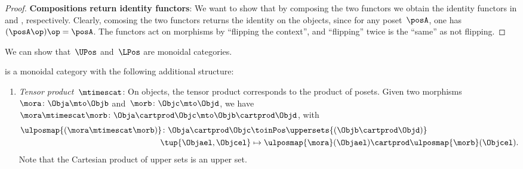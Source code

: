 \begin{proof}
	\textbf{Compositions return identity functors}:
	We want to show that by composing the two functors we obtain the identity functors in \UPos and \LPos, respectively.
	Clearly, comosing the two functors returns the identity on the objects, since for any poset~$\posA$, one has~$(\posA\op)\op=\posA$.
	The functors act on morphisms by ``flipping the context'', and ``flipping'' twice is the ``same'' as not flipping.
\end{proof}

We can show that~$\UPos$ and~$\LPos$ are monoidal categories.

\begin{lemma}
	\label{lem:upos_moncat}
	\UPos is a monoidal category with the following additional structure:
	\begin{enumerate}
		\item \emph{Tensor product~$\mtimescat$}: On objects, the tensor product corresponds to the product of posets.
		      Given two morphisms~$\mora\colon \Obja\mto \Objb$ and~$\morb\colon \Objc\mto \Objd$, we have~$\mora \mtimescat \morb\colon  \Obja \cartprod \Objc \mto \Objb\cartprod \Objd$, with
		      \begin{equation}
			      \begin{aligned}
				      \ulposmap{(\mora\mtimescat \morb)}\colon \Obja \cartprod \Objc & \toinPos \uppersets{(\Objb\cartprod \Objd)}                           \\
				      \tup{\Objael,\Objcel}                                          & \mapsto \ulposmap{\mora}(\Objael)\cartprod \ulposmap{\morb}(\Objcel).
			      \end{aligned}
		      \end{equation}
		      Note that the Cartesian product of upper sets is an upper set.


\end{enumerate}
\end{lemma}
